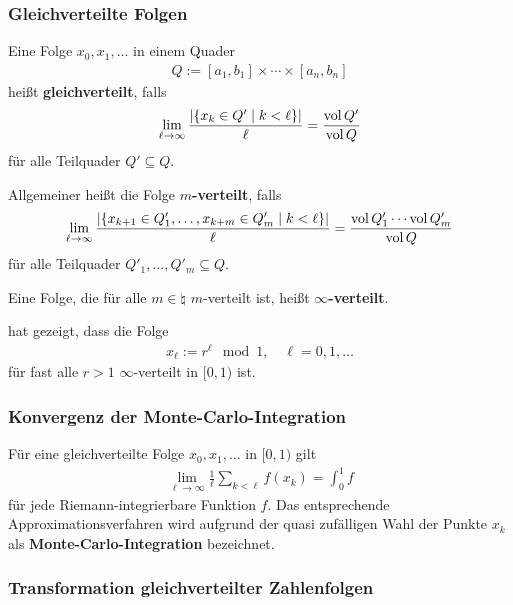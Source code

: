 \subsubsection{%
    Gleichverteilte Folgen%
}

Eine Folge $x_0, x_1, \dotsc$ in einem Quader
\begin{align*}
    Q := [a_1, b_1] \times \dotsb \times [a_n, b_n]
\end{align*}
heißt \textbf{gleichverteilt}, falls
\begin{align*}
    \lim_{\ell \to \infty} \frac{|\{x_k \in Q' \;|\; k < \ell\}|}{\ell}
    = \frac{\operatorname{vol} Q'}{\operatorname{vol} Q}
\end{align*}
für alle Teilquader $Q' \subseteq Q$.

Allgemeiner heißt die Folge \textbf{$m$-verteilt}, falls
\begin{align*}
    \lim_{\ell \to \infty} \frac{|\{x_{k+1} \in Q'_1, \dotsc, x_{k+m} \in Q'_m
    \;|\; k < \ell\}|}{\ell}
    = \frac{\operatorname{vol} Q'_1 \dotsm \operatorname{vol} Q'_m}{\operatorname{vol} Q}
\end{align*}
für alle Teilquader $Q'_1, \dotsc, Q'_m \subseteq Q$.

Eine Folge, die für alle $m \in \natural$ $m$-verteilt ist, heißt
\textbf{$\infty$-verteilt}.

\linie

 hat gezeigt, dass die Folge
\begin{align*}
    x_\ell := r^\ell \mod 1,\quad \ell = 0, 1, \dotsc
\end{align*}
für fast alle $r > 1$ $\infty$-verteilt in $[0, 1)$ ist. 

\subsubsection{%
    Konvergenz der Monte-Carlo-Integration%
}

Für eine gleichverteilte Folge $x_0, x_1, \dotsc$ in $[0, 1)$ gilt
\begin{align*}
    \lim_{\ell \to \infty} \frac{1}{\ell} \sum_{k<\ell} f(x_k) = \int_0^1 f
\end{align*}
für jede Riemann-integrierbare Funktion $f$.
Das entsprechende Approximationsverfahren wird aufgrund der quasi zufälligen
Wahl der Punkte $x_k$ als \textbf{Monte-Carlo-Integration} bezeichnet.

\pagebreak

\subsubsection{%
    Transformation gleichverteilter Zahlenfolgen%
}

